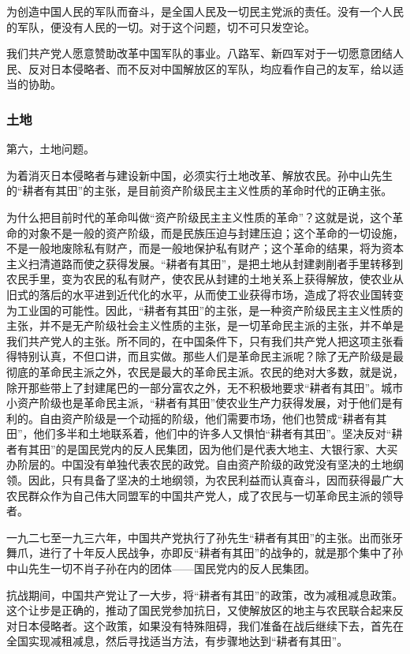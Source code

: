 为创造中国人民的军队而奋斗，是全国人民及一切民主党派的责任。没有一个人民的军队，便没有人民的一切。对于这个问题，切不可只发空论。

我们共产党人愿意赞助改革中国军队的事业。八路军、新四军对于一切愿意团结人民、反对日本侵略者、而不反对中国解放区的军队，均应看作自己的友军，给以适当的协助。

\subsubsection{土地}

第六，土地问题。

为着消灭日本侵略者与建设新中国，必须实行土地改革、解放农民。孙中山先生的“耕者有其田”的主张，是目前资产阶级民主主义性质的革命时代的正确主张。

为什么把目前时代的革命叫做“资产阶级民主主义性质的革命”？这就是说，这个革命的对象不是一般的资产阶级，而是民族压迫与封建压迫；这个革命的一切设施，不是一般地废除私有财产，而是一般地保护私有财产；这个革命的结果，将为资本主义扫清道路而使之获得发展。“耕者有其田”，是把土地从封建剥削者手里转移到农民手里，变为农民的私有财产，使农民从封建的土地关系上获得解放，使农业从旧式的落后的水平进到近代化的水平，从而使工业获得市场，造成了将农业国转变为工业国的可能性。因此，“耕者有其田”的主张，是一种资产阶级民主主义性质的主张，并不是无产阶级社会主义性质的主张，是一切革命民主派的主张，并不单是我们共产党人的主张。所不同的，在中国条件下，只有我们共产党人把这项主张看得特别认真，不但口讲，而且实做。那些人们是革命民主派呢？除了无产阶级是最彻底的革命民主派之外，农民是最大的革命民主派。农民的绝对大多数，就是说，除开那些带上了封建尾巴的一部分富农之外，无不积极地要求“耕者有其田”。城市小资产阶级也是革命民主派，“耕者有其田”使农业生产力获得发展，对于他们是有利的。自由资产阶级是一个动摇的阶级，他们需要市场，他们也赞成“耕者有其田”，他们多半和土地联系着，他们中的许多人又惧怕“耕者有其田”。坚决反对“耕者有其田”的是国民党内的反人民集团，因为他们是代表大地主、大银行家、大买办阶层的。中国没有单独代表农民的政党。自由资产阶级的政党没有坚决的土地纲领。因此，只有具备了坚决的土地纲领，为农民利益而认真奋斗，因而获得最广大农民群众作为自己伟大同盟军的中国共产党人，成了农民与一切革命民主派的领导者。

一九二七至一九三六年，中国共产党执行了孙先生“耕者有其田”的主张。出而张牙舞爪，进行了十年反人民战争，亦即反“耕者有其田”的战争的，就是那个集中了孙中山先生一切不肖子孙在内的团体——国民党内的反人民集团。

抗战期间，中国共产党让了一大步，将“耕者有其田”的政策，改为减租减息政策。这个让步是正确的，推动了国民党参加抗日，又使解放区的地主与农民联合起来反对日本侵略者。这个政策，如果没有特殊阻碍，我们准备在战后继续下去，首先在全国实现减租减息，然后寻找适当方法，有步骤地达到“耕者有其田”。

